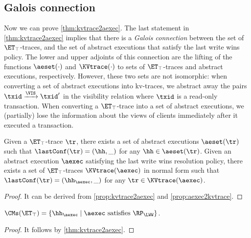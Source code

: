 \subsection{Galois connection}
\label{sec:galois-kv-aexec}
Now we can prove \cref{thm:kvtrace2aexec}.
The last statement in \cref{thm:kvtrace2aexec} implies that there is a \emph{Galois connection}
between the set of $\ET_{\top}$-traces, and the set of abstract executions that satisfy the 
last write wins policy. The lower and upper adjoints of this connection are the 
lifting of the functions $\aeset(\cdot)$ and $\KVtrace(\cdot)$ to sets of $\ET_{\top}$-traces 
and abstract executions, respectively. However, these two sets are not isomorphic: 
when converting a set of abstract executions into kv-traces, we abstract away the 
pairs $\txid \xrightarrow{\VIS} \txid'$ in the visibility relation where $\txid$ is a read-only transaction.
When converting a $\ET_{\top}$-trace into a set of abstract executions, 
we (partially) lose the information about the views of clients immediately after it executed a transaction.

\begin{theorem}
\label{thm:kvtrace2aexec}
Given a $\ET_{\top}$-trace $\tr$, there exists a set of abstract executions $\aeset({\tr})$ 
such that $\lastConf(\tr) = (\hh, \_)$ for any $\hh \in \aeset(\tr)$.
Given an abstract execution $\aexec$ satisfying the last write wins resolution policy,
there exists a set of $\ET_{\top}$-traces $\KVtrace({\aexec})$ in normal form
such that $\lastConf(\tr) = (\hh_{\aexec}, \_)$ for any $\tr \in \KVtrace({\aexec})$.
\end{theorem}
\begin{proof}
    It can be derived from \cref{prop:kvtrace2aexec} and \cref{prop:aexec2kvtrace}.
\end{proof}

\begin{corollary} 
\label{cor:kvtrace2aexec}
$\CMs(\ET_{\top}) = \{\hh_{\aexec} \mid \aexec \text{ satisfies } \RP_{\LWW}\}$.
\end{corollary}
\begin{proof}
    It follows by \cref{thm:kvtrace2aexec}.
\end{proof}

